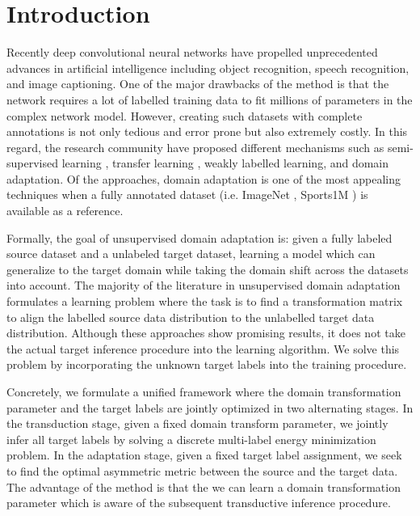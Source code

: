 \documentclass{article}
\begin{document}
\section{Introduction}
\label{intro}
Recently deep convolutional neural networks \cite{alexnet, vggnet, googlenet} have propelled unprecedented advances in artificial intelligence including object recognition, speech recognition, and image captioning. One of the major drawbacks of the method is that the network requires a lot of labelled training data to fit millions of parameters in the complex network model. However, creating such datasets with complete annotations is not only tedious and error prone but also extremely costly. In this regard, the research community have proposed different mechanisms such as semi-supervised learning \cite{semisup1,semisup2,semisup3}, transfer learning \cite{transfer1, transfer2}, weakly labelled learning, and domain adaptation. Of the approaches, domain adaptation is one of the most appealing techniques when a fully annotated dataset (i.e. ImageNet \cite{ImageNet}, Sports1M \cite{sports1m}) is available as a reference. 

Formally, the goal of unsupervised domain adaptation is: given a fully labeled source dataset and a unlabeled target dataset, learning a model which can generalize to the target domain while taking the domain shift across the datasets into account. The majority of the literature \cite{gong12, baochen15, fernando13, baochen16, tommasi13} in unsupervised domain adaptation formulates a learning problem where the task is to find a transformation matrix to align the labelled source data distribution to the unlabelled target data distribution. Although these approaches show promising results, it does not take the actual target inference procedure into the learning algorithm. We solve this problem by incorporating the unknown target labels into the training procedure.

Concretely, we formulate a unified framework where the domain transformation parameter and the target labels are jointly optimized in two alternating stages. In the transduction stage, given a fixed domain transform parameter, we jointly infer all target labels by solving a discrete multi-label energy minimization problem. In the adaptation stage, given a fixed target label assignment, we seek to find the optimal asymmetric metric  between the source and the target data. The advantage of the method is that the we can learn a domain transformation parameter which is aware of the subsequent transductive inference procedure. 
\end{document}
